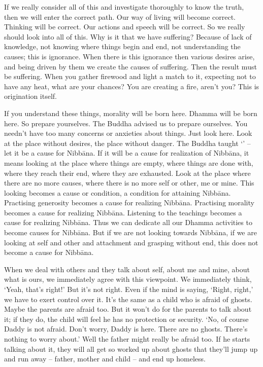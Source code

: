 If we really consider all of this and investigate thoroughly to know the truth, then we will enter the correct path. Our way of living will become correct. Thinking will be correct. Our actions and speech will be correct. So we really should look into all of this. Why is it that we have suffering? Because of lack of knowledge, not knowing where things begin and end, not understanding the causes; this is ignorance. When there is this ignorance then various desires arise, and being driven by them we create the causes of suffering. Then the result must be suffering. When you gather firewood and light a match to it, expecting not to have any heat, what are your chances? You are creating a fire, aren't you? This is origination itself.

If you understand these things, morality will be born here. Dhamma will be born here. So prepare yourselves. The Buddha advised us to prepare ourselves. You needn't have too many concerns or anxieties about things. Just look here. Look at the place without desires, the place without danger. The Buddha taught `' -- let it be a cause for Nibb\=ana. If it will be a cause for realization of Nibb\=ana, it means looking at the place where things are empty, where things are done with, where they reach their end, where they are exhausted. Look at the place where there are no more causes, where there is no more self or other, me or mine. This looking becomes a cause or condition, a condition for attaining Nibb\=ana. Practising generosity becomes a cause for realizing Nibb\=ana. Practising morality becomes a cause for realizing Nibb\=ana. Listening to the teachings becomes a cause for realizing Nibb\=ana. Thus we can dedicate all our Dhamma activities to become causes for Nibb\=ana. But if we are not looking towards Nibb\=ana, if we are looking at self and other and attachment and grasping without end, this does not become a cause for Nibb\=ana.

When we deal with others and they talk about self, about me and mine, about what is ours, we immediately agree with this viewpoint. We immediately think, `Yeah, that's right!' But it's not right. Even if the mind is saying, `Right, right,' we have to exert control over it. It's the same as a child who is afraid of ghosts. Maybe the parents are afraid too. But it won't do for the parents to talk about it; if they do, the child will feel he has no protection or security. `No, of course Daddy is not afraid. Don't worry, Daddy is here. There are no ghosts. There's nothing to worry about.' Well the father might really be afraid too. If he starts talking about it, they will all get so worked up about ghosts that they'll jump up and run away -- father, mother and child -- and end up homeless.

